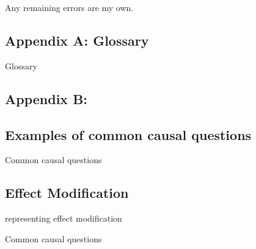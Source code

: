 \documentclass[
  single column]{article}
\begin{document}
Any remaining errors are my own.

\newpage{}

\subsection{Appendix A: Glossary}\label{appendix-a-glossary}

\begin{table}

\caption{\label{tbl-experiments}Glossary}

\centering{

\glossaryTerms

}

\end{table}%

\subsection{Appendix B:}\label{appendix-b}

\subsection{Examples of common causal
questions}\label{examples-of-common-causal-questions}

\begin{table}

\caption{\label{tbl-common-interests}Common causal questions}

\centering{

\terminologycommoncausalinterests

}

\end{table}%

\subsection{Effect Modification}\label{effect-modification}

\begin{table}

\caption{\label{tbl-common-interests}representing effect modification}

\centering{

\terminologyeffectmodification

}

\end{table}%

\begin{table}

\caption{\label{tbl-common-interests}Common causal questions}

\centering{

\terminologyeffectmodificationtypes

}

\end{table}%
\end{document}
